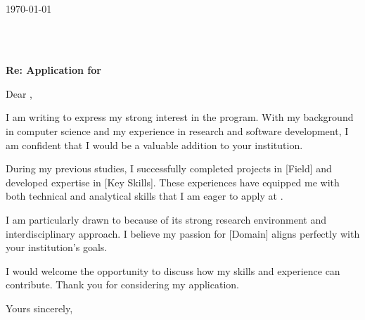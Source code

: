 \begin{flushright}
  \textbf{\myName} \\
  \myAddress \\
  \myCity \\
  \myEmail \\
  \today
\end{flushright}

\vspace{1em}

\textbf{\recipientName} \\
\recipientOrg \\
\recipientAddress

\vspace{2em}

\textbf{Re: Application for \positionApplied}

\vspace{1em}

Dear \recipientName,

I am writing to express my strong interest in the \positionApplied{} program. With my background in computer science and my experience in research and software development, I am confident that I would be a valuable addition to your institution.

During my previous studies, I successfully completed projects in [Field] and developed expertise in [Key Skills]. These experiences have equipped me with both technical and analytical skills that I am eager to apply at \recipientOrg.

I am particularly drawn to \recipientOrg{} because of its strong research environment and interdisciplinary approach. I believe my passion for [Domain] aligns perfectly with your institution's goals.

I would welcome the opportunity to discuss how my skills and experience can contribute. Thank you for considering my application.

Yours sincerely,

\vspace{2em}

\textbf{\myName}
